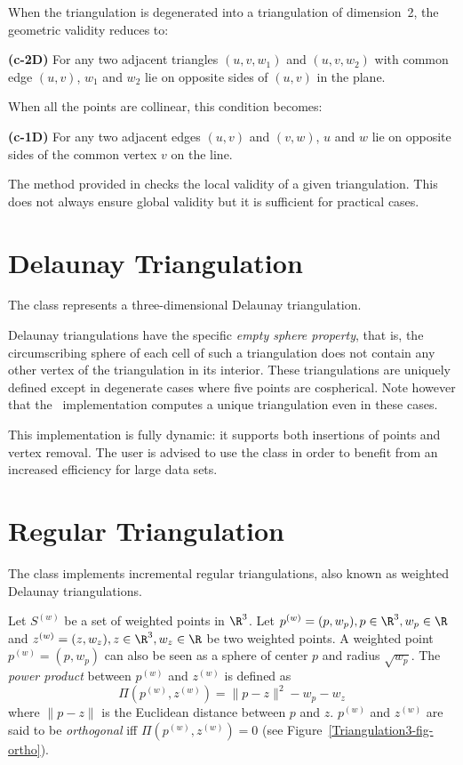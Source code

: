 When the triangulation is degenerated into a triangulation of
dimension~2, the  geometric validity reduces to:

{\bf (c-2D)} For any two adjacent triangles $(u,v,w_1)$ and $(u,v,w_2)$ with
common edge $(u,v)$, $w_1$ and $w_2$ lie on opposite sides of $(u,v)$
in the plane.

When all the points are collinear, this condition becomes:

{\bf (c-1D)} For any two adjacent edges $(u,v)$ and $(v,w)$, $u$ and
$w$ lie on opposite sides of the common vertex $v$ on the line.

The  method provided in  checks
the local validity of a given triangulation. This does not always
ensure global validity \cite{mnssssu-cgpvg-96,dlpt-ccpps-98} but it is 
sufficient for practical cases.


\section{Delaunay Triangulation} 

The class  represents a three-dimensional
Delaunay triangulation.

Delaunay triangulations have the specific \textit{empty sphere property},
that is, the circumscribing sphere of each cell of such a triangulation
does not contain any other vertex of the triangulation in its interior.
These triangulations are uniquely defined except in degenerate cases
where five points are cospherical.  Note however that the \cgal\ implementation
computes a unique triangulation even in these cases.

This implementation is fully dynamic: it supports both insertions of points
and vertex removal.
The user is advised to use the class  in
order to benefit from an increased efficiency for large data sets. 

\section{Regular Triangulation} 
\label{Triangulation3-sec-class-Regulartriangulation}

The class  implements incremental regular
triangulations, also known as weighted Delaunay triangulations.

Let ${S}^{(w)}$ be a set of weighted points in $\R^3$. Let
${p}^{(w)}=(p,w_p), p\in\R^3, w_p\in\R$ and 
${z}^{(w)}=(z,w_z), z\in\R^3, w_z\in\R$ be two weighted points. 
A weighted point
${p}^{(w)}=(p,w_p)$ can also be seen as a sphere of center $p$ and
radius $\sqrt{w_p}$. 
The \textit{power product} between ${p}^{(w)}$ and ${z}^{(w)}$ is
defined as 
\[\Pi({p}^{(w)},{z}^{(w)}) = {\|{p-z}\|^2-w_p-w_z}\]
where $\|{p-z}\|$ is the Euclidean distance between $p$ and $z$. 
 ${p}^{(w)}$ and ${z}^{(w)}$
are said to be \textit{orthogonal} iff $\Pi{({p}^{(w)},{z}^{(w)})}
= 0$ (see Figure~\ref{Triangulation3-fig-ortho}).

